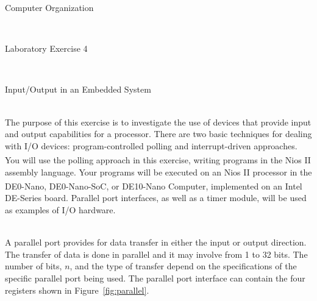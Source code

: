 \documentclass[epsfig,10pt,fullpage]{article}
\newcommand{\LabNum}{4}
\begin{document}
\centerline{\huge Computer Organization}
~\\
\centerline{\huge Laboratory Exercise \LabNum}
~\\
\centerline{\large Input/Output in an Embedded System}
~\\

\noindent
The purpose of this exercise is to investigate the use of devices that provide input and
output capabilities for a processor. There are two basic techniques for dealing with I/O devices:
program-controlled polling and interrupt-driven approaches.  You will use the polling approach 
in this exercise, writing programs in the Nios\textsuperscript{\textregistered} II assembly language. 
Your programs will be executed on an Nios II processor in the DE0-Nano,
DE0-Nano-SoC, or DE10-Nano Computer, implemented on an Intel\textsuperscript{\textregistered} DE-Series board.  Parallel port interfaces, 
as well as a timer module, will be used as examples of I/O hardware.

~\\
\noindent
A parallel port provides for data transfer in either the input or output direction.  The 
transfer of data is done in parallel and it may involve from 1 to 32 bits. The number of
bits, $n$, and the type of transfer depend on the specifications of the specific parallel port 
being used.  The parallel port interface can contain the four registers shown in
Figure~\ref{fig:parallel}.
\end{document}
